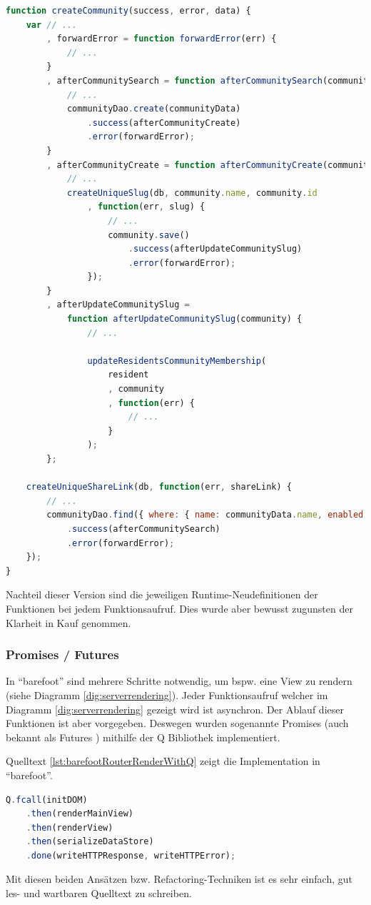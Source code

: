 \begin{lstlisting}[language=JavaScript, firstnumber=192, caption={Ausschnitt aus dem neusten Community Controller \cite{masterCommunityController}}, label={lst:callbackHellFunctional}]
function createCommunity(success, error, data) {
	var // ...
		, forwardError = function forwardError(err) {
			// ...
		}
		, afterCommunitySearch = function afterCommunitySearch(community) {
			// ...
			communityDao.create(communityData)
				.success(afterCommunityCreate)
				.error(forwardError);
		}
		, afterCommunityCreate = function afterCommunityCreate(community) {
			// ...
			createUniqueSlug(db, community.name, community.id
				, function(err, slug) {
					// ...
					community.save()
						.success(afterUpdateCommunitySlug)
						.error(forwardError);
				});
		}
		, afterUpdateCommunitySlug =
			function afterUpdateCommunitySlug(community) {
				// ...

				updateResidentsCommunityMembership(
					resident
					, community
					, function(err) {
						// ...
					}
				);
		};

	createUniqueShareLink(db, function(err, shareLink) {
		// ...
		communityDao.find({ where: { name: communityData.name, enabled: true }})
			.success(afterCommunitySearch)
			.error(forwardError);
	});
}
\end{lstlisting}

Nachteil dieser Version sind die jeweiligen Runtime-Neudefinitionen der Funktionen bei jedem Funktionsaufruf. Dies wurde aber bewusst zugunsten der Klarheit in Kauf genommen.

\subsubsection*{Promises / Futures}
In ``barefoot'' sind mehrere Schritte notwendig, um bspw. eine View zu rendern (siehe Diagramm \ref{dig:serverrendering}).
Jeder Funktionsaufruf welcher im Diagramm \ref{dig:serverrendering} gezeigt wird ist asynchron. Der Ablauf dieser Funktionen ist aber vorgegeben.
Deswegen wurden sogenannte Promises (auch bekannt als Futures \cite{FuturesAndPromises}) mithilfe der Q Bibliothek \cite{QLibrary} implementiert.

Quelltext \ref{lst:barefootRouterRenderWithQ} zeigt die Implementation in ``barefoot''.

\begin{lstlisting}[language=JavaScript, firstnumber=215, caption={Ausschnitt aus Server router-mixin.js \cite{barefootRouterRenderWithQ}}, label={lst:barefootRouterRenderWithQ}]
	Q.fcall(initDOM)
	.then(renderMainView)
	.then(renderView)
	.then(serializeDataStore)
	.done(writeHTTPResponse, writeHTTPError);
\end{lstlisting}

Mit diesen beiden Ansätzen bzw. Refactoring-Techniken ist es sehr einfach, gut les- und wartbaren Quelltext zu schreiben.